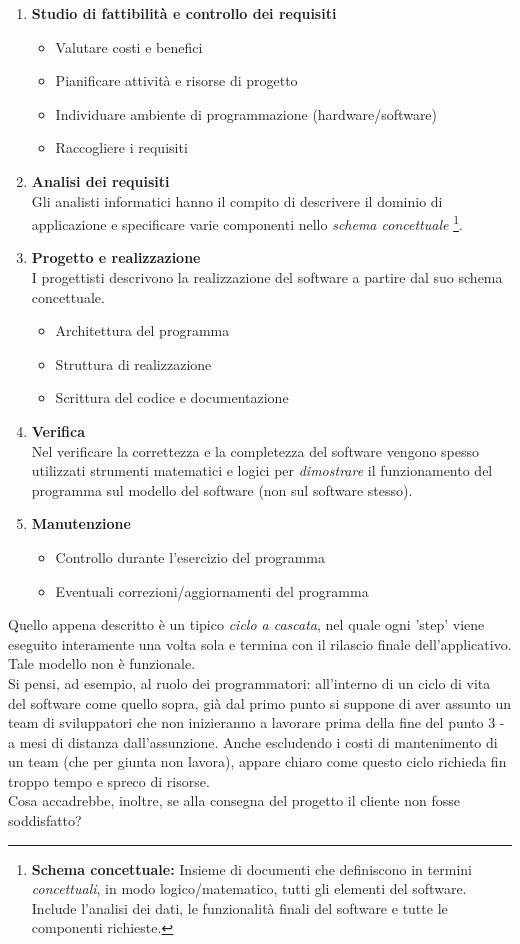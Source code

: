 \begin{enumerate}
	\item \textbf{Studio di fattibilità e controllo dei requisiti}
		\begin{itemize}
			\item Valutare costi e benefici
			\item Pianificare attività e risorse di progetto
			\item Individuare ambiente di programmazione (hardware/software)
			\item Raccogliere i requisiti
		\end{itemize}
	\item \textbf{Analisi dei requisiti} \hfill \\
		Gli analisti informatici hanno il compito di descrivere il dominio di applicazione e specificare varie componenti nello \textit{schema concettuale}
		\footnote{\textbf{Schema concettuale:} Insieme di documenti che definiscono in termini \textit{concettuali}, in modo logico/matematico, tutti gli elementi del software. 
		Include l'analisi dei dati, le funzionalità finali del software e tutte le componenti richieste.}.
	\item \textbf{Progetto e realizzazione} \hfill \\
		I progettisti descrivono la realizzazione del software a partire dal suo schema concettuale.
		\begin{itemize}
			\item Architettura del programma
			\item Struttura di realizzazione
			\item Scrittura del codice e documentazione
		\end{itemize}
	\item \textbf{Verifica} \hfill \\
		Nel verificare la correttezza e la completezza del software vengono spesso utilizzati strumenti matematici e logici	per \textit{dimostrare} il funzionamento del programma sul modello del software (non sul software stesso).
	\item \textbf{Manutenzione}
		\begin{itemize}
			\item Controllo durante l'esercizio del programma
			\item Eventuali correzioni/aggiornamenti del programma
		\end{itemize}
\end{enumerate}
Quello appena descritto è un tipico \textit{ciclo a cascata}, nel quale ogni 'step' viene eseguito interamente una volta sola e termina con il rilascio finale dell'applicativo.\\
Tale modello non è funzionale.\\
Si pensi, ad esempio, al ruolo dei programmatori: all'interno di un ciclo di vita del software come quello sopra, già dal primo punto si suppone di aver assunto un team di sviluppatori che non inizieranno a lavorare prima della fine del punto 3 - a mesi di distanza dall'assunzione. Anche escludendo i costi di mantenimento di un team (che per giunta non lavora), appare chiaro come questo ciclo richieda fin troppo tempo e spreco di risorse.\\
Cosa accadrebbe, inoltre, se alla consegna del progetto il cliente non fosse soddisfatto?
